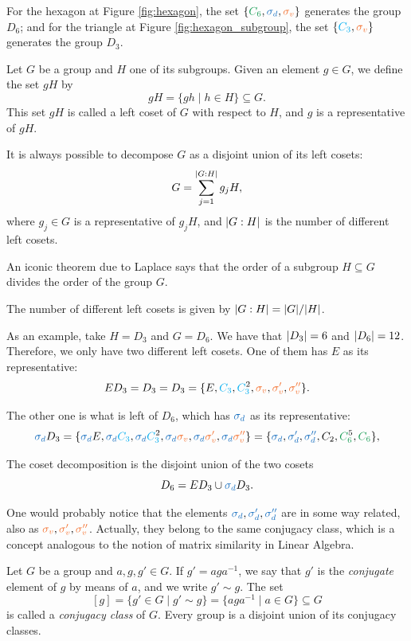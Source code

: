 For the hexagon at Figure \ref{fig:hexagon}, the set $\{\Cs, \sd, \sv\}$ generates the group $D_6$; and for the triangle at Figure \ref{fig:hexagon_subgroup}, the set $\{\Ct, \sv\}$ generates the group $D_3$.

\begin{definition}
Let $G$ be a group and $H$ one of its subgroups. Given an element $g \in G$, we define the set $gH$ by
$$
gH = \{g h \mid h \in H\} \subseteq G.
$$
This set $gH$ is called a left coset of $G$ with respect to $H$, and $g$ is a representative of $gH$.

It is always possible to decompose $G$ as a disjoint union of its left cosets:
$$
G = \sum_{j=1}^{\abs{G:H}} g_j H,
$$
where $g_j \in G$ is a representative of $g_j H$, and $\abs{G:H}$ is the number of different left cosets.
\end{definition}

An iconic theorem due to Laplace says that the order of a subgroup $H \subseteq G$ divides the order of the group $G$.

\begin{theorem}
The number of different left cosets is given by $\abs{G:H} = \abs{G} / \abs{H}$.
\end{theorem}

As an example, take $H = D_3$ and $G = D_6$. We have that $\abs{D_3}=6$ and $\abs{D_6} = 12$. Therefore, we only have two different left cosets. One of them has $E$ as its representative:
$$
E D_3 = D_3 = D_3 = \{E, \Ct, \Ctn{2}, \sv, \svp, \svpp\}.
$$

The other one is what is left of $D_6$, which has $\sd$ as its representative:
$$
\sd D_3 = \{\sd E, \sd \Ct, \sd \Ctn{2}, \sd \sv, \sd \svp, \sd \svpp\}
= \{ \sd, \sdp, \sdpp, C_2, \Csn{5}, \Cs \},
$$

The coset decomposition is the disjoint union of the two cosets
$$
D_6 = ED_3 \cup \sd D_3.
$$

One would probably notice that the elements $\sd, \sdp, \sdpp$ are in some way related, also as $\sv, \svp, \svpp$. Actually, they belong to the same conjugacy class, which is a concept analogous to the notion of matrix similarity in Linear Algebra.

\begin{definition}
Let $G$ be a group and $a, g, g' \in G$. If $g' = a g a^{-1}$, we say that $g'$ is the \textit{conjugate} element of $g$ by means of $a$, and we write $g' \sim g$. The set
$$
[g] = \{ g' \in G \mid g' \sim g \} = \{ a g a^{-1} \mid a \in G \} \subseteq G
$$
is called a \textit{conjugacy class} of $G$. Every group is a disjoint union of its conjugacy classes.
\end{definition}

